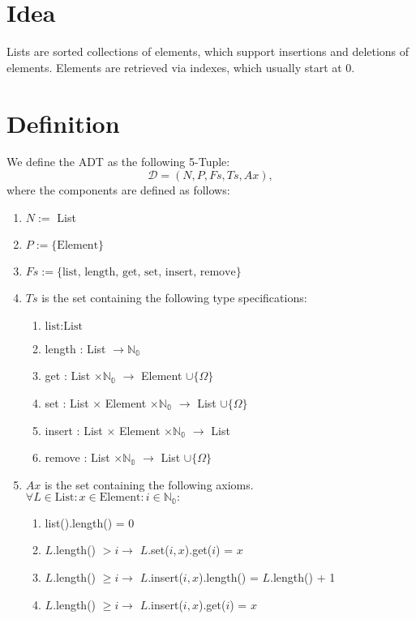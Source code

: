\documentclass{article}
\begin{document}
\section*{Idea}
Lists are sorted collections of elements, which support insertions and deletions of elements. Elements are retrieved via indexes, which usually start at 0.


\section*{Definition}
We define the ADT as the following 5-Tuple:
\[\mathcal{D} = (N, P, Fs, Ts, Ax),\]
where the components are defined as follows:

\begin{enumerate}
 \item \(N :=\) List
 \item \(P := \{ \text{Element} \}\)
 \item \(Fs := \{ \text{list, length, get, set, insert, remove} \}\)
 \item \(Ts\) is the set containing the following type specifications:
	\begin{enumerate}
		\item \( \text{list} : \text{List} \)
		\item length : List \(\rightarrow \mathbb{N_0}\)
		\item get : List \(\times \mathbb{N_0}\) \(\rightarrow\) Element \(\cup \{\Omega\}\)
		\item set : List \(\times\) Element \(\times \mathbb{N_0}\) \(\rightarrow\) List \(\cup \{\Omega\}\)
		\item insert : List \(\times\) Element \(\times \mathbb{N_0}\) \(\rightarrow\) List
		\item remove : List \(\times \mathbb{N_0}\) \(\rightarrow\) List \(\cup \{\Omega\}\)
	\end{enumerate}
 \item \(Ax\) is the set containing the following axioms. \\
	\(\forall L \in \text{List} : x \in \text{Element} : i \in \mathbb{N_0} :\)
	\begin{enumerate}
		\item list().length() = 0
		\item \(L\).length() \(> i \rightarrow\) \(L\).set(\(i, x\)).get(\(i\)) = \(x\)
		\item \(L\).length() \(\geq i \rightarrow\) \(L\).insert(\(i, x\)).length() = \(L\).length() + 1
		\item \(L\).length() \(\geq i \rightarrow\) \(L\).insert(\(i, x\)).get(\(i\)) = \(x\)

\end{enumerate}
\end{enumerate}
\end{document}
